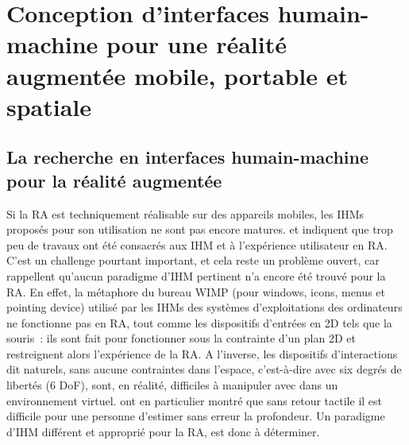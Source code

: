 \section*{Conception d'interfaces humain-machine pour une réalité augmentée mobile, portable et spatiale}
\subsection*{La recherche en interfaces humain-machine pour la réalité augmentée}
Si la RA est techniquement réalisable sur des appareils mobiles, les IHMs proposés pour son utilisation ne sont pas encore matures. \citet{ZhouDuhBillinghurst2008} et \citet{DeSaChurchill2013} indiquent que trop peu de travaux ont été consacrés aux IHM et à l'expérience utilisateur en RA. C'est un challenge pourtant important, et cela reste un problème ouvert, car \citet{VanKrevelenPoelman2010} rappellent qu'aucun paradigme d'IHM pertinent n'a encore été trouvé pour la RA. En effet, la métaphore du bureau WIMP (pour \foreignlanguage{english}{windows}, \foreignlanguage{english}{icons}, \foreignlanguage{english}{menus} et \foreignlanguage{english}{pointing device}) utilisé par les IHMs des systèmes d'exploitations des ordinateurs ne fonctionne pas en RA, tout comme les dispositifs d'entrées en 2D tels que la souris~: ils sont fait pour fonctionner sous la contrainte d'un plan 2D et restreignent alors l'expérience de la RA. \citep{VanKrevelenPoelman2010} A l'inverse, les dispositifs d'interactions dit naturels, sans aucune contraintes dans l'espace, c'est-à-dire avec six degrés de libertés (6 DoF), sont, en réalité, difficiles à manipuler avec dans un environnement virtuel. \citet{ChanKaoChenEtAl2010} ont en particulier montré que sans retour tactile il est difficile pour une personne d'estimer sans erreur la profondeur. Un paradigme d'IHM différent et approprié pour la RA, est donc à déterminer.


